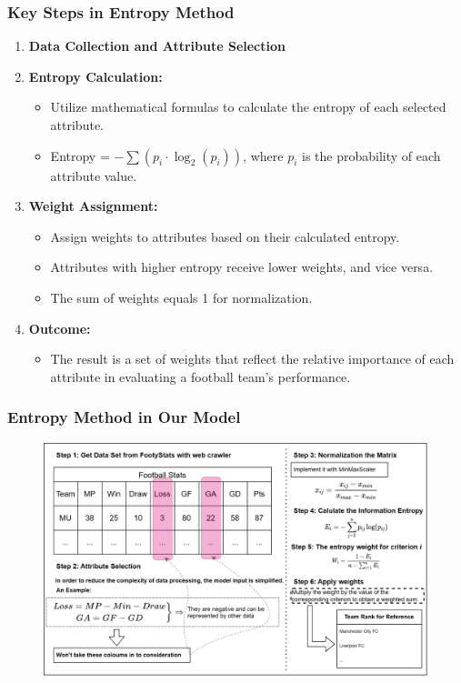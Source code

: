 \documentclass{beamer}
\begin{document}
\begin{frame}
  \frametitle{Key Steps in Entropy Method}
  \begin{enumerate}
    \item \textbf{Data Collection and Attribute Selection}
    \item \textbf{Entropy Calculation:}
          \begin{itemize}
            \item Utilize mathematical formulas to calculate the entropy of each selected attribute.
            \item Entropy = $- \sum (p_i \cdot \log_2(p_i))$, where $p_i$ is the probability of each attribute value.
          \end{itemize}

    \item \textbf{Weight Assignment:}
          \begin{itemize}
            \item Assign weights to attributes based on their calculated entropy.
            \item Attributes with higher entropy receive lower weights, and vice versa.
            \item The sum of weights equals 1 for normalization.
          \end{itemize}

    \item \textbf{Outcome:}
          \begin{itemize}
            \item The result is a set of weights that reflect the relative importance of each attribute in evaluating a football team's performance.
          \end{itemize}
  \end{enumerate}
\end{frame}
% 
% 
\begin{frame}
  \frametitle{Entropy Method in Our Model}
  \begin{figure}
    \includegraphics[width=\textwidth]{img/entropy_method_flowchart.png}
  \end{figure}
\end{frame}
% 
% 
% 
% 
% 
% 
% 
% 
% 
% 
% 
% 
% 
% 
\end{document}

